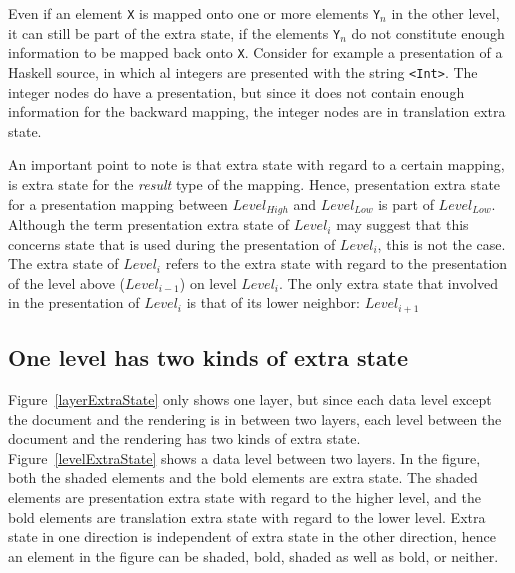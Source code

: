 
Even if an element \verb|X| is mapped onto one or more elements \verb|Y|$_n$  in the other level, it can still be part of the extra state, if the elements \verb|Y|$_n$ do not constitute enough information to be mapped back onto \verb|X|. Consider for example a presentation of a Haskell source, in which al integers are presented with the string \verb|<Int>|. The integer nodes do have a presentation, but since it does not contain enough information for the backward mapping, the integer nodes are in translation extra state.  

An important point to note is that extra state with regard to a certain mapping, is extra state for the {\em result} type of the mapping. Hence, presentation extra state for a presentation mapping between $Level_{High}$ and $Level_{Low}$ is part of $Level_{Low}$. Although the term presentation extra state of $Level_i$ may suggest that this concerns state that is used during the presentation of $Level_i$, this is not the case. The extra state of $Level_i$ refers to the extra state with regard to the presentation of the level above ($Level_{i-1}$) on level $Level_i$. The only extra state that involved in the presentation of $Level_i$ is that of its lower neighbor: $Level_{i+1}$



%																
\subsection{One level has two kinds of extra state}

Figure~\ref{layerExtraState} only shows one layer, but since each data level except the document and the rendering is in between two layers, each level between the document and the rendering has two kinds of extra state. Figure~\ref{levelExtraState} shows a data level between two layers. In the figure, both the shaded elements and the bold elements are extra state. The shaded elements are presentation extra state with regard to the higher level, and the bold elements are translation extra state with regard to the lower level. Extra state in one direction is independent of extra state in the other direction, hence an element in the figure can be shaded, bold, shaded as well as bold, or neither. 

